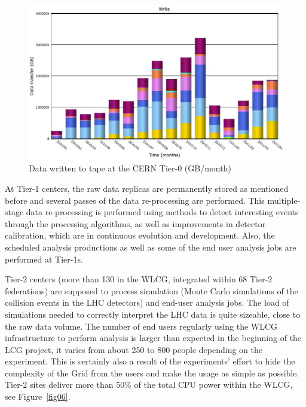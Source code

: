 \begin{figure}[htb] %
\centering
\includegraphics[width=13cm]{fig05.eps} %
\caption{Data written to tape at the CERN Tier-0
(GB/month)}\label{fig05}
\end{figure}


At Tier-1 centers, the raw data replicas are permanently stored as
mentioned before and several passes of the data re-processing are
performed. This multiple-stage data re-processing is performed using
methods to detect interesting events through the processing
algorithms, as well as improvements in detector calibration, which
are in continuous evolution and development. Also, the scheduled
analysis productions as well as some of the end user analysis jobs
are performed at Tier-1s.

Tier-2 centers  (more than 130 in the WLCG, integrated within 68
Tier-2 federations) are supposed to process simulation (Monte Carlo
simulations of the collision events in the LHC detectors) and
end-user analysis jobs. The load of simulations needed to correctly
interpret the LHC data is quite sizeable, close to the raw data
volume. The number of end users regularly using the WLCG
infrastructure to perform analysis is larger than expected in the
beginning of the LCG project, it varies from about 250 to 800 people
depending on the experiment. This is certainly also a result of the
experiments' effort to hide the complexity of the Grid from the
users and make the usage as simple as possible. Tier-2 sites deliver
more than 50\% of the total CPU power within the WLCG, see
Figure~\ref{fig06}.

